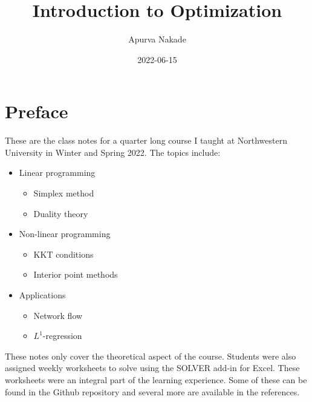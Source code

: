 \documentclass[
]{book}
\title{Introduction to Optimization}
\author{Apurva Nakade}
\date{2022-06-15}
\providecommand{\tightlist}{%
  \setlength{\itemsep}{0pt}\setlength{\parskip}{0pt}}
\theoremstyle{definition}
\theoremstyle{definition}
\theoremstyle{definition}
\theoremstyle{definition}
\theoremstyle{remark}
\begin{document}
\maketitle

\thispagestyle{empty}


{
\setcounter{tocdepth}{2}
\tableofcontents
}
\hypertarget{preface}{%
\chapter*{Preface}\label{preface}}


These are the class notes for a quarter long course I taught at Northwestern University in Winter and Spring 2022. The topics include:

\begin{itemize}
\tightlist
\item
  Linear programming

  \begin{itemize}
  \tightlist
  \item
    Simplex method
  \item
    Duality theory
  \end{itemize}
\item
  Non-linear programming

  \begin{itemize}
  \tightlist
  \item
    KKT conditions
  \item
    Interior point methods
  \end{itemize}
\item
  Applications

  \begin{itemize}
  \tightlist
  \item
    Network flow
  \item
    \(L^1\)-regression
  \end{itemize}
\end{itemize}

These notes only cover the theoretical aspect of the course. Students were also assigned weekly worksheets to solve using the SOLVER add-in for Excel. These worksheets were an integral part of the learning experience. Some of these can be found in the Github repository and several more are available in the references.
\end{document}
